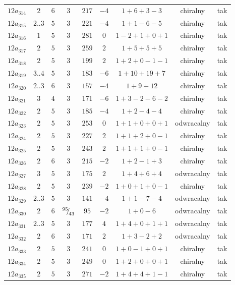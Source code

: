 \begin{longtable}{ccccccccc}
$12a_{314}$ & $2$ & $6$ & $3$ & $217$ & $-4$ & $1+6+3-3$ & chiralny & tak \\
$12a_{315}$ & $2..3$ & $5$ & $3$ & $221$ & $-4$ & $1+1-6-5$ & chiralny & tak \\
$12a_{316}$ & $1$ & $5$ & $3$ & $281$ & $0$ & $1-2+1+0+1$ & chiralny & tak \\
$12a_{317}$ & $2$ & $5$ & $3$ & $259$ & $2$ & $1+5+5+5$ & chiralny & tak \\
$12a_{318}$ & $2$ & $5$ & $3$ & $199$ & $2$ & $1+2+0-1-1$ & chiralny & tak \\
$12a_{319}$ & $3..4$ & $5$ & $3$ & $183$ & $-6$ & $1+10+19+7$ & chiralny & tak \\
$12a_{320}$ & $2..3$ & $6$ & $3$ & $157$ & $-4$ & $1+9+12$ & chiralny & tak \\
$12a_{321}$ & $3$ & $4$ & $3$ & $171$ & $-6$ & $1+3-2-6-2$ & chiralny & tak \\
$12a_{322}$ & $2$ & $5$ & $3$ & $185$ & $-4$ & $1+2-4-4$ & chiralny & tak \\
$12a_{323}$ & $2$ & $5$ & $3$ & $253$ & $0$ & $1+1+0+0+1$ & odwracalny & tak \\
$12a_{324}$ & $2$ & $5$ & $3$ & $227$ & $2$ & $1+1+2+0-1$ & chiralny & tak \\
$12a_{325}$ & $2$ & $5$ & $3$ & $243$ & $2$ & $1+1+1+0-1$ & chiralny & tak \\
$12a_{326}$ & $2$ & $6$ & $3$ & $215$ & $-2$ & $1+2-1+3$ & chiralny & tak \\
$12a_{327}$ & $3$ & $5$ & $3$ & $175$ & $2$ & $1+4+6+4$ & odwracalny & tak \\
$12a_{328}$ & $2$ & $5$ & $3$ & $239$ & $-2$ & $1+0+1+0-1$ & chiralny & tak \\
$12a_{329}$ & $2..3$ & $5$ & $3$ & $141$ & $-4$ & $1+1-7-4$ & odwracalny & tak \\
$12a_{330}$ & $2$ & $6$ & ${}^{95}{\mskip -5mu/\mskip -3mu}_{43}$ & $95$ & $-2$ & $1+0-6$ & odwracalny & tak \\
$12a_{331}$ & $2..3$ & $5$ & $3$ & $177$ & $4$ & $1+4+0+1+1$ & odwracalny & tak \\
$12a_{332}$ & $2$ & $6$ & $3$ & $171$ & $2$ & $1+3-2+2$ & odwracalny & tak \\
$12a_{333}$ & $2$ & $5$ & $3$ & $241$ & $0$ & $1+0-1+0+1$ & chiralny & tak \\
$12a_{334}$ & $2$ & $5$ & $3$ & $249$ & $0$ & $1+2+0+0+1$ & chiralny & tak \\
$12a_{335}$ & $2$ & $5$ & $3$ & $271$ & $-2$ & $1+4+4+1-1$ & chiralny & tak \\

\end{longtable}
